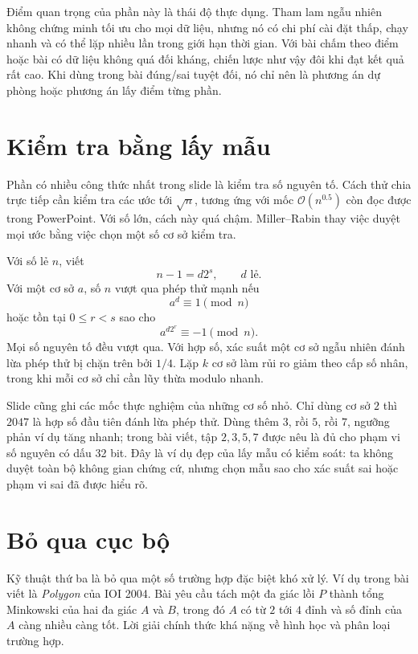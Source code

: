 \documentclass[11pt]{article}
\newcommand{\Oh}{\mathcal{O}}
\begin{document}
Điểm quan trọng của phần này là thái độ thực dụng. Tham lam ngẫu nhiên không
chứng minh tối ưu cho mọi dữ liệu, nhưng nó có chi phí cài đặt thấp, chạy
nhanh và có thể lặp nhiều lần trong giới hạn thời gian. Với bài chấm theo
điểm hoặc bài có dữ liệu không quá đối kháng, chiến lược như vậy đôi khi đạt
kết quả rất cao. Khi dùng trong bài đúng/sai tuyệt đối, nó chỉ nên là phương
án dự phòng hoặc phương án lấy điểm từng phần.

\section{Kiểm tra bằng lấy mẫu}

Phần có nhiều công thức nhất trong slide là kiểm tra số nguyên tố. Cách thử
chia trực tiếp cần kiểm tra các ước tới \(\sqrt n\), tương ứng với mốc
\(\Oh(n^{0.5})\) còn đọc được trong PowerPoint. Với số lớn, cách này quá chậm.
Miller--Rabin thay việc duyệt mọi ước bằng việc chọn một số cơ sở kiểm tra.

Với số lẻ \(n\), viết
\[
  n-1=d2^s,\qquad d\text{ lẻ}.
\]
Với một cơ sở \(a\), số \(n\) vượt qua phép thử mạnh nếu
\[
  a^d\equiv 1\pmod n
\]
hoặc tồn tại \(0\le r<s\) sao cho
\[
  a^{d2^r}\equiv -1\pmod n.
\]
Mọi số nguyên tố đều vượt qua. Với hợp số, xác suất một cơ sở ngẫu nhiên đánh
lừa phép thử bị chặn trên bởi \(1/4\). Lặp \(k\) cơ sở làm rủi ro giảm theo
cấp số nhân, trong khi mỗi cơ sở chỉ cần lũy thừa modulo nhanh.

Slide cũng ghi các mốc thực nghiệm của những cơ số nhỏ. Chỉ dùng cơ sở \(2\)
thì \(2047\) là hợp số đầu tiên đánh lừa phép thử. Dùng thêm \(3\), rồi
\(5\), rồi \(7\), ngưỡng phản ví dụ tăng nhanh; trong bài viết, tập
\(2,3,5,7\) được nêu là đủ cho phạm vi số nguyên có dấu 32 bit. Đây là ví dụ
đẹp của lấy mẫu có kiểm soát: ta không duyệt toàn bộ không gian chứng cứ,
nhưng chọn mẫu sao cho xác suất sai hoặc phạm vi sai đã được hiểu rõ.

\section{Bỏ qua cục bộ}

Kỹ thuật thứ ba là bỏ qua một số trường hợp đặc biệt khó xử lý. Ví dụ trong
bài viết là \textit{Polygon} của IOI 2004. Bài yêu cầu tách một đa giác lồi
\(P\) thành tổng Minkowski của hai đa giác \(A\) và \(B\), trong đó \(A\) có
từ \(2\) tới \(4\) đỉnh và số đỉnh của \(A\) càng nhiều càng tốt. Lời giải
chính thức khá nặng về hình học và phân loại trường hợp.
\end{document}
